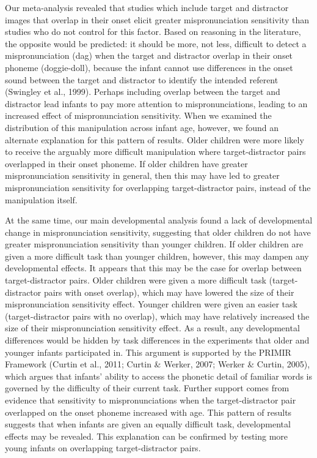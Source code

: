 \documentclass[man]{apa6}
\begin{document}
Our meta-analysis revealed that studies which include target and distractor images that overlap in their onset elicit greater mispronunciation sensitivity than studies who do not control for this factor. Based on reasoning in the literature, the opposite would be predicted: it should be more, not less, difficult to detect a mispronunciation (dag) when the target and distractor overlap in their onset phoneme (doggie-doll), because the infant cannot use differences in the onset sound between the target and distractor to identify the intended referent (Swingley et al., 1999). Perhaps including overlap between the target and distractor lead infants to pay more attention to mispronunciations, leading to an increased effect of mispronunciation sensitivity. When we examined the distribution of this manipulation across infant age, however, we found an alternate explanation for this pattern of results. Older children were more likely to receive the arguably more difficult manipulation where target-distractor pairs overlapped in their onset phoneme. If older children have greater mispronunciation sensitivity in general, then this may have led to greater mispronunciation sensitivity for overlapping target-distractor pairs, instead of the manipulation itself.

At the same time, our main developmental analysis found a lack of developmental change in mispronunciation sensitivity, suggesting that older children do not have greater mispronunciation sensitivity than younger children. If older children are given a more difficult task than younger children, however, this may dampen any developmental effects. It appears that this may be the case for overlap between target-distractor pairs. Older children were given a more difficult task (target-distractor pairs with onset overlap), which may have lowered the size of their mispronunciation sensitivity effect. Younger children were given an easier task (target-distractor pairs with no overlap), which may have relatively increased the size of their mispronunciation sensitivity effect. As a result, any developmental differences would be hidden by task differences in the experiments that older and younger infants participated in. This argument is supported by the PRIMIR Framework (Curtin et al., 2011; Curtin \& Werker, 2007; Werker \& Curtin, 2005), which argues that infants' ability to access the phonetic detail of familiar words is governed by the difficulty of their current task. Further support comes from evidence that sensitivity to mispronunciations when the target-distractor pair overlapped on the onset phoneme increased with age. This pattern of results suggests that when infants are given an equally difficult task, developmental effects may be revealed. This explanation can be confirmed by testing more young infants on overlapping target-distractor pairs.
\end{document}
